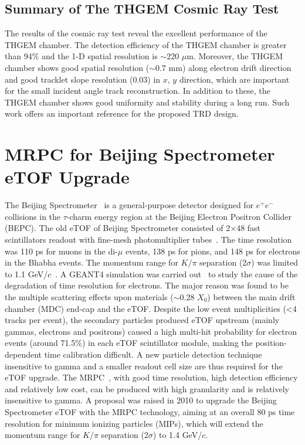 \subsection{Summary of The THGEM Cosmic Ray Test}
The results of the cosmic ray test reveal the excellent performance of the THGEM chamber. The detection efficiency of the THGEM chamber is greater than 94$\%$ and the 1-D spatial resolution is $\sim$220 $\mu$m. Moreover, the THGEM chamber shows good spatial resolution ($\sim$0.7 mm) along electron drift direction and good tracklet slope resolution (0.03) in $x$, $y$ direction, which are important for the small incident angle track reconstruction. In addition to these, the THGEM chamber shows good uniformity and stability during a long run. Such work offers an important reference for the proposed TRD design.

\section{MRPC for Beijing Spectrometer eTOF Upgrade}
The Beijing Spectrometer~\cite{beijingSpe} is a general-purpose detector designed for $e^{+}e^{-}$ collisions in the $\tau$-charm energy region at the Beijing Electron Positron Collider (BEPC\uppercase\expandafter{}). The old eTOF of Beijing Spectrometer consisted of 2$\times$48 fast scintillators readout with fine-mesh photomultiplier tubes~\cite{oldETOF}. The time resolution was 110 ps for muons in the di-$\mu$ events, 138 ps for pions, and 148 ps for electrons in the Bhabha events. The momentum range for $K/\pi$ separation (2$\sigma$) was limited to 1.1 GeV/$c$~\cite{pikIdentification}. A GEANT4 simulation was carried out~\cite{eTOFSimulation} to study the cause of the degradation of time resolution for electrons. The major reason was found to be the multiple scattering effects upon materials ($\sim$0.28 $X_{0}$) between the main drift chamber (MDC) end-cap and the eTOF. Despite the low event multiplicities (<4 tracks per event), the secondary particles produced eTOF upstream (mainly gammas, electrons and positrons) caused a high multi-hit probability for electron events (around 71.5\%) in each eTOF scintillator module, making the position-dependent time calibration difficult. A new particle detection technique insensitive to gamma and a smaller readout cell size are thus required for the eTOF upgrade. The MRPC~\cite{mrpc0,mrpc1,mrpc2}, with good time resolution, high detection efficiency and relatively low cost, can be produced with high granularity and is relatively insensitive to gamma. A proposal was raised in 2010 to upgrade the Beijing Spectrometer eTOF with the MRPC technology, aiming at an overall 80 ps time resolution for minimum ionizing particles (MIPs), which will extend the momentum range for $K/\pi$ separation (2$\sigma$) to 1.4 GeV/$c$.

